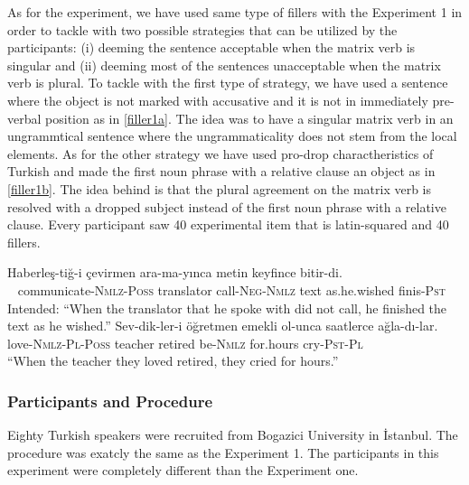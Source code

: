 \documentclass[doc]{apa6}
\begin{document}
As for the experiment, we have used same type of fillers with the Experiment 1 in order to tackle with two possible strategies that can be utilized by the participants: (i) deeming the sentence acceptable when the matrix verb is singular and (ii) deeming most of the sentences unacceptable when the matrix verb is plural. To tackle with the first type of strategy, we have used a sentence where the object is not marked with accusative and it is not in immediately pre-verbal position as in \autoref{filler1a}. The idea was to have a singular matrix verb in an ungrammtical sentence where the ungrammaticality does not stem from the local elements. As for the other strategy we have used pro-drop charactheristics of Turkish and made the first noun phrase with a relative clause an object as in \autoref{filler1b}. The idea behind is that the plural agreement on the matrix verb is resolved with a dropped subject instead of the first noun phrase with a relative clause. Every participant saw 40 experimental item that is latin-squared and 40 fillers.

\begin{exe}
\ex
\begin{xlist}
\ex \label{filler1a}
\gll * Haberleş-tiğ-i çevirmen ara-ma-yınca metin keyfince bitir-di.\\
{\ } communicate-\textsc{Nmlz}-\textsc{Poss} translator call-\textsc{Neg}-\textsc{Nmlz} text as.he.wished finis-\textsc{Pst}\\
\glt Intended: ``When the translator that he spoke with did not call, he finished the text as he wished.''
\ex \label{filler1b}
\gll Sev-dik-ler-i öğretmen emekli ol-unca saatlerce ağla-dı-lar.\\
love-\textsc{Nmlz}-\textsc{Pl}-\textsc{Poss} teacher retired be-\textsc{Nmlz} for.hours cry-\textsc{Pst}-\textsc{Pl}\\
\glt ``When the teacher they loved retired, they cried for hours.''
\end{xlist}
\end{exe}

\hypertarget{participants-and-procedure-1}{%
\subsubsection{Participants and Procedure}\label{participants-and-procedure-1}}

Eighty Turkish speakers were recruited from Bogazici University in İstanbul. The procedure was exatcly the same as the Experiment 1. The participants in this experiment were completely different than the Experiment one.
\end{document}
